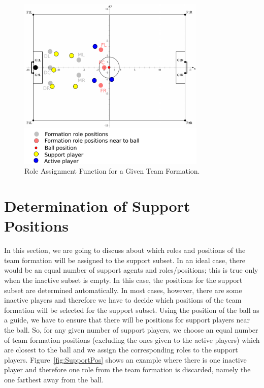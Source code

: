 \begin{figure}[t!]
\centering
  \includegraphics[width=0.8\textwidth]{Chapter4/figures/RoleAss.pdf}
  \caption{Role Assignment Function for a Given Team Formation.} 
  \label{fig:RoleAss}
\end{figure}



\section{Determination of Support Positions}
In this section, we are going to discuss about which roles and positions of the team formation will be assigned to the support subset. In an ideal case, there would be an equal number of support agents and roles/positions; this is true only when the inactive subset is empty. In this case, the positions for the support subset are determined automatically. In most cases, however, there are some inactive players and therefore we have to decide which positions of the team formation will be selected for the support subset. Using the position of the ball as a guide, we have to ensure that there will be positions for support players near the ball. So, for any given number of support players, we choose an equal number of team formation positions (excluding the ones given to the active players) which are closest to the ball and we assign the corresponding roles to the support players. Figure~\ref{fig:SupportPos} shows an example where there is one inactive player and therefore one role from the team formation is discarded, namely the one farthest away from the ball. 


